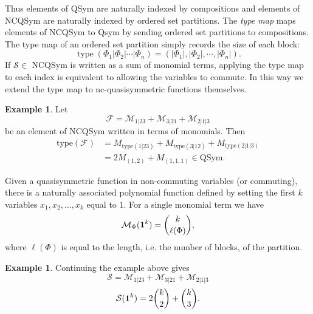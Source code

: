 \documentclass[12pt,reqno]{amsart}
\numberwithin{definition}{section}
\theoremstyle{definition}
\newtheorem{example}[definition]{Example}
\newcommand{\SSS}{\mathcal{S}}
\newcommand{\type}{\operatorname{type}}
\newcommand{\ncM}{\mathcal{M}}
\newcommand{\poly}{\chi} %
\begin{document}
Thus elements of QSym are naturally indexed by
compositions and elements of NCQSym are naturally indexed by ordered
set partitions.  
The \emph{type map} maps elements of NCQSym to Qsym by sending ordered set partitions to compositions.
The type map of an ordered set partition simply records the size of each block:
$$\type(\Phi_1|\Phi_2|\cdots|\Phi_n) = (|\Phi_1|, |\Phi_2|, \cdots, |\Phi_n|).$$
If $\mathcal{S} \in$ NCQSym is written as a sum of monomial terms,
applying the type map to each index is equivalent to allowing the
variables to commute.  In this way we extend the type map to nc-quasisymmetric functions themselves.

\begin{example}
Let $$\mathcal{F} = \ncM_{1|23} + \ncM_{3|21} + \ncM_{2|1|3}$$ be an element of NCQSym written in terms of monomials.  Then 
\begin{align*}
\textrm{type}(\mathcal{F}) & =  M_{\textrm{type} (1|23)} + M_{\textrm{type} (3|12)} + M_{\textrm{type} (2|1|3)} \\
&  = 2 M_{(1,2)} + M_{(1,1,1)} \in \textrm{QSym}.
\end{align*}
\end{example}



Given a quasisymmetric function in non-commuting variables (or
commuting), there is a naturally associated polynomial function
defined by setting the first $k$ variables $x_1, x_2, \ldots, x_k$ equal to $1$. For a single monomial term we have
$$\ncM_{\Phi} ({\bf 1}^k) = { k \choose \ell(\Phi) },$$
where $\ell(\Phi)$ is equal to the length, i.e. the number of blocks, of the partition.


\begin{example}
 Continuing the example above gives
$$\mathcal{S} = \ncM_{1|23} + \ncM_{3|21} + \ncM_{2|1|3}$$
$$ \mathcal{S}({\bf 1}^k) = 2 {k \choose 2} + {k \choose 3}.$$  
\end{example}

\end{document}
